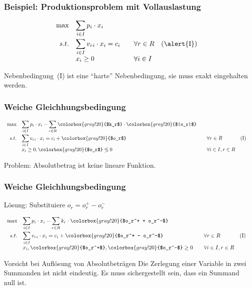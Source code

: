 \begin{frame}
 \frametitle{Beispiel: Produktionsproblem mit Vollauslastung}
 \begin{equation*}
  \begin{array}{rllr}
    \max & \displaystyle\sum_{i\in I} p_i\cdot x_i & & \\[3ex]
    s.t. & \displaystyle\sum_{i\in I} v_{ri}\cdot x_i = c_i & \quad\forall r\in R & \mathrm{(\alert{I})}\\
	  & x_i \geq 0 & \quad\forall i\in I & \\
  \end{array}
 \end{equation*}
 
 Nebenbedingung~\textrm{(\alert{I})} ist eine "`harte"' Nebenbedingung, sie muss exakt eingehalten werden.
\end{frame}

\begin{frame}
 \frametitle{Weiche Gleichhungsbedingung}
  \begin{equation*}
    \begin{array}{rllr}
      \max & \displaystyle\sum_{i\in I} p_i\cdot x_i - \sum_{r\in R} \colorbox{gray!20}{$k_r$} \cdot \colorbox{gray!20}{$|o_r|$} & & \\[3ex]
      s.t. & \displaystyle\sum_{i\in I} v_{ri}\cdot x_i = c_i + \colorbox{gray!20}{$o_r$} & \quad\forall r\in R & \mathrm{(I)}\\
	    & x_i \geq 0, \colorbox{gray!20}{$o_r$} \lessgtr0 & \quad\forall i\in I, r\in R & \\
    \end{array}
  \end{equation*}
 
 Problem: Absolutbetrag ist keine lineare Funktion.
\end{frame}

\begin{frame}
 \frametitle{Weiche Gleichhungsbedingung}
  Lösung: Substituiere $o_r = o_r^+ - o_r^-$
  
  \begin{equation*}
    \begin{array}{rllr}
      \max & \displaystyle\sum_{i\in I} p_i\cdot x_i - \sum_{r\in R} k_r \cdot \colorbox{gray!20}{$o_r^+ + o_r^-$} & & \\[3ex]
      s.t. & \displaystyle\sum_{i\in I} v_{ri}\cdot x_i = c_i + \colorbox{gray!20}{$o_r^+ - o_r^-$} & \quad\forall r\in R & \mathrm{(I)}\\
	    & x_i, \colorbox{gray!20}{$o_r^+$}, \colorbox{gray!20}{$o_r^-$} \geq 0 & \quad\forall i\in I, r\in R & \\
    \end{array}
  \end{equation*}
  
  \begin{alertblock}{Vorsicht bei Auflösung von Absolutbeträgen}
   Die Zerlegung einer Variable in zwei Summanden ist nicht eindeutig. Es muss sichergestellt sein, dass ein Summand null ist.
  \end{alertblock}
\end{frame}

